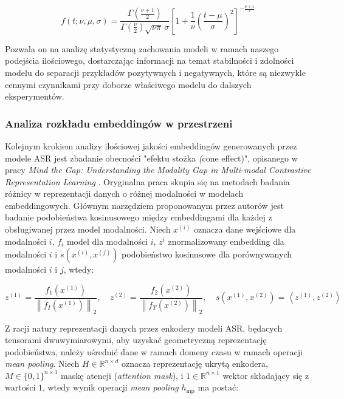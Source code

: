 \begin{equation}
f(t; \nu, \mu, \sigma) =
\frac{\Gamma\!\left(\frac{\nu+1}{2}\right)}
     {\Gamma\!\left(\frac{\nu}{2}\right) \sqrt{\nu \pi}\, \sigma}
\left[ 1 + \frac{1}{\nu} \left( \frac{t - \mu}{\sigma} \right)^2 \right]^{-\frac{\nu+1}{2}}
\label{eq:studentT}
\end{equation}

Pozwala on na analizę statystyczną zachowania modeli w ramach naszego podejścia ilościowego, dostarczając informacji na temat stabilności i zdolności modelu do separacji przykładów pozytywnych i negatywnych, które są niezwykle cennymi czynnikami przy doborze właściwego modelu do dalszych eksperymentów.

\subsubsection{Analiza rozkładu embeddingów w przestrzeni}
Kolejnym krokiem analizy ilościowej jakości embeddingów generowanych przez modele ASR jest zbadanie obecności "efektu stożka \textit(cone effect)", opisanego w pracy \textit{Mind the Gap: Understanding the Modality Gap in Multi-modal Contrastive Representation Learning} \cite{liang2022mind}. Oryginalna praca skupia się na metodach badania różnicy w reprezentacji danych o różnej modalności w modelach embeddingowych. Głównym narzędziem proponowanym przez autorów jest badanie podobieństwa kosinusowego między embeddingami dla każdej z obsługiwanej przez model modalności. Niech $x^{(i)}$ oznacza dane wejściowe dla modalności $i$, $f_i$ model dla modalności $i$, $z^i$ znormalizowany embedding dla modalności $i$ i $s(x^{(i)}, x^{(j)})$ podobieństwo kosinusowe dla porównywanych modalności $i$ i $j$, wtedy:

\begin{equation}
z^{(1)} = \frac{f_1(x^{(1)})}{\left\| f_I(x^{(1)}) \right\|_2},
\quad
z^{(2)} = \frac{f_2(x^{(2)})}{\left\| f_T(x^{(2)}) \right\|_2},
\quad
s(x^{(1)}, x^{(2)}) = \left\langle z^{(1)}, z^{(2)} \right\rangle
\end{equation}

Z racji natury reprezentacji danych przez enkodery modeli ASR, będacych tensorami dwuwymiarowymi, aby uzyskać geometryczną reprezentację podobieństwa, należy uśrednić dane w ramach domeny czasu w ramach operacji \textit{mean pooling}. Niech $H \in \mathbb{R}^{n \times d}$ oznacza reprezentację ukrytą enkodera, $M \in \{0,1\}^{n \times 1}$ maskę atencji (\textit{attention mask}), i $1 \in \mathbb{R}^{n \times 1}$ wektor składający się z wartości $1$, wtedy wynik operacji \textit{mean pooling} $h_\text{mp}$ ma postać:

